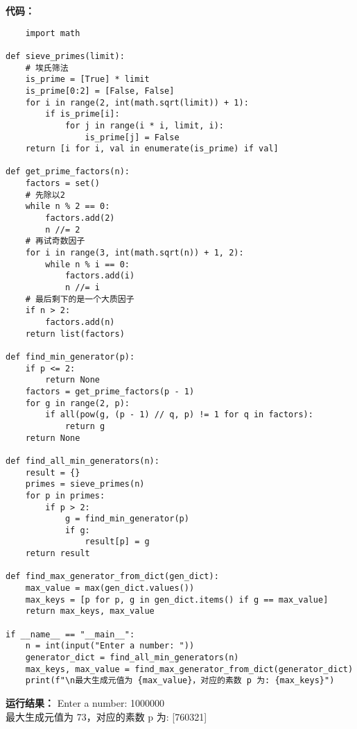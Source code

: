 \documentclass[a4paper]{CINTA}
\begin{document}
\textbf{代码：}
\begin{verbatim}
    import math

def sieve_primes(limit):
    # 埃氏筛法
    is_prime = [True] * limit
    is_prime[0:2] = [False, False]
    for i in range(2, int(math.sqrt(limit)) + 1):
        if is_prime[i]:
            for j in range(i * i, limit, i):
                is_prime[j] = False
    return [i for i, val in enumerate(is_prime) if val]

def get_prime_factors(n):
    factors = set()
    # 先除以2
    while n % 2 == 0:
        factors.add(2)
        n //= 2
    # 再试奇数因子
    for i in range(3, int(math.sqrt(n)) + 1, 2):
        while n % i == 0:
            factors.add(i)
            n //= i
    # 最后剩下的是一个大质因子
    if n > 2:
        factors.add(n)
    return list(factors)

def find_min_generator(p):
    if p <= 2:
        return None
    factors = get_prime_factors(p - 1)
    for g in range(2, p):
        if all(pow(g, (p - 1) // q, p) != 1 for q in factors):
            return g
    return None

def find_all_min_generators(n):
    result = {}
    primes = sieve_primes(n)
    for p in primes:
        if p > 2:
            g = find_min_generator(p)
            if g:
                result[p] = g
    return result

def find_max_generator_from_dict(gen_dict):
    max_value = max(gen_dict.values())
    max_keys = [p for p, g in gen_dict.items() if g == max_value]
    return max_keys, max_value

if __name__ == "__main__":
    n = int(input("Enter a number: "))
    generator_dict = find_all_min_generators(n)
    max_keys, max_value = find_max_generator_from_dict(generator_dict)
    print(f"\n最大生成元值为 {max_value}，对应的素数 p 为: {max_keys}")
\end{verbatim}

\textbf{运行结果：}
Enter a number: 1000000 \\
最大生成元值为 73，对应的素数 p 为: [760321]
\end{document}

